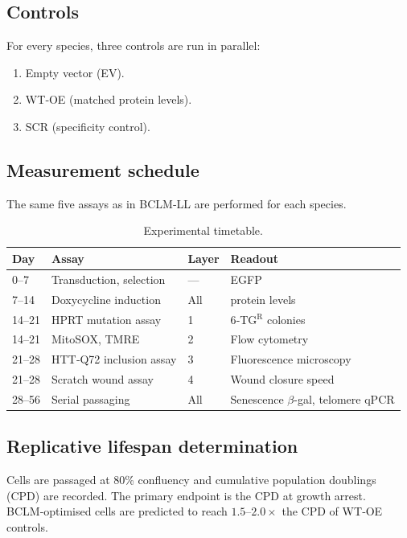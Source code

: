 \documentclass[12pt,a4paper]{article}
\begin{document}
	\subsection{Controls}
	For every species, three controls are run in parallel:
	\begin{enumerate}
		\item Empty vector (EV).
		\item WT‑OE (matched protein levels).
		\item SCR (specificity control).
	\end{enumerate}
	
	\subsection{Measurement schedule}
	The same five assays as in BCLM‑LL are performed for each species.
	
	\begin{table}[H]
		\centering
		\caption{Experimental timetable.}
		\label{tab:schedule}
		\begin{tabular}{@{}llll@{}}
			\toprule
			\textbf{Day} & \textbf{Assay} & \textbf{Layer} & \textbf{Readout} \\
			\midrule
			0–7   & Transduction, selection & --- & EGFP \\
			7–14  & Doxycycline induction & All & protein levels \\
			14–21 & HPRT mutation assay & 1 & 6‑TG\(^{\mathrm{R}}\) colonies \\
			14–21 & MitoSOX, TMRE & 2 & Flow cytometry \\
			21–28 & HTT‑Q72 inclusion assay & 3 & Fluorescence microscopy \\
			21–28 & Scratch wound assay & 4 & Wound closure speed \\
			28–56 & Serial passaging & All & Senescence \(\beta\)-gal, telomere qPCR \\
			\bottomrule
		\end{tabular}
	\end{table}
	
	\subsection{Replicative lifespan determination}
	Cells are passaged at 80\% confluency and cumulative population doublings (CPD) are recorded. The primary endpoint is the CPD at growth arrest. BCLM‑optimised cells are predicted to reach \(1.5\)–\(2.0\times\) the CPD of WT‑OE controls.
	
\end{document}
